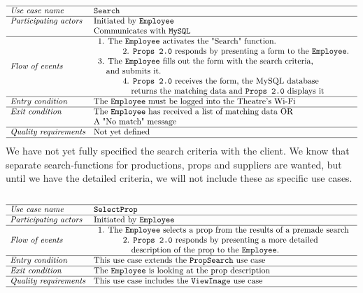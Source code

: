 \documentclass[12pt]{article}
\begin{document}
\[
\begin{array}{ll}
\hline
\textit{Use case name} & \texttt{Search} \\
\hline
\textit{Participating actors} & \text{Initiated by \texttt{Employee}} \\
& \text{Communicates with \texttt{MySQL}} \\
\hline
\textit{Flow of events} & 
\begin{array}{l}
\text{1. The \texttt{Employee} activates the "Search" function.}\\
\quad \quad \quad \text{2. \texttt{Props 2.0} responds by presenting a form to the \texttt{Employee}.} \\
\text{3. The \texttt{Employee} fills out the form with the search criteria,} \\ \quad \text{and submits it.} \\
\quad \quad \quad \text{4. \texttt{Props 2.0} receives the form, the MySQL database} \\ \quad \quad \quad \quad \text{returns the matching data and \texttt{Props 2.0} displays it}
\end{array} \\
\hline
\textit{Entry condition} & \text{The \texttt{Employee} must be logged into the Theatre's Wi-Fi} \\
\hline
\textit{Exit condition} & \text{The \texttt{Employee} has received a list of matching data OR} \\ & \text{A "No match"  message} \\
\hline
\textit{Quality requirements} & \text{Not yet defined} \\
\hline
\end{array}
\]
We have not yet fully specified the search criteria with the client. We know that separate search-functions for productions, props and suppliers are wanted, but until we have the detailed criteria, we will not include these as specific use cases.  
\\
\\
\[
\begin{array}{ll}
\hline
\textit{Use case name} & \texttt{SelectProp} \\
\hline
\textit{Participating actors} & \text{Initiated by \texttt{Employee}} \\
\hline
\textit{Flow of events} & 
\begin{array}{l}
\text{1. The \texttt{Employee} selects a prop from the results of a premade search} \\
\quad \quad \quad \text{2. \texttt{Props 2.0} responds by presenting a more detailed}\\ \quad \quad \quad \quad \text{description of the prop to the \texttt{Employee}.}
\end{array} \\
\hline
\textit{Entry condition} & \text{This use case extends the  \texttt{PropSearch} use case} \\
\hline
\textit{Exit condition} & \text{The \texttt{Employee} is looking at the prop description} \\
\hline
\textit{Quality requirements} & \text{This use case includes the \texttt{ViewImage} use case} \\
\hline
\end{array}
\]
\end{document}
